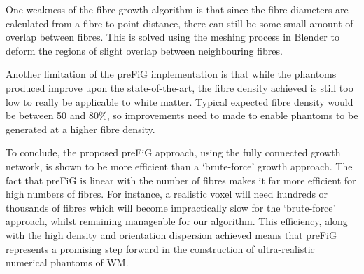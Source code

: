 One weakness of the fibre-growth algorithm is that since the fibre diameters are calculated from a fibre-to-point distance, there can still be some small amount of overlap between fibres.
This is solved using the meshing process in Blender to deform the regions of slight overlap between neighbouring fibres.

Another limitation of the \ac{preFiG} implementation is that while the phantoms produced improve upon the state-of-the-art, the fibre density achieved is still too low to really be applicable to white matter. Typical expected fibre density would be between 50 and 80\%, so improvements need to made to enable phantoms to be generated at a higher fibre density.

To conclude, the proposed \ac{preFiG} approach, using the fully connected growth network, is shown to be more efficient than a `brute-force' growth approach.
The fact that \ac{preFiG} is linear with the number of fibres makes it far more efficient for high numbers of fibres. For instance, a realistic voxel will need hundreds or thousands of fibres which will become impractically slow for the `brute-force' approach, whilst remaining manageable for our algorithm.
This efficiency, along with the high density and orientation dispersion achieved means that \ac{preFiG} represents a promising step forward in the construction of ultra-realistic numerical phantoms of WM.


